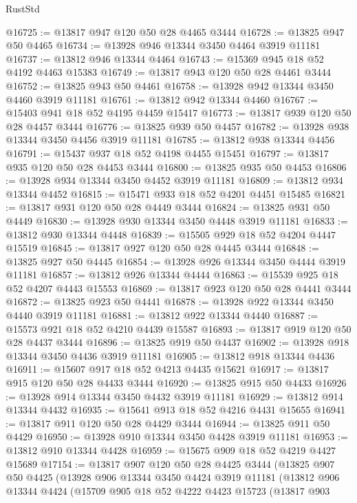 \begin{lexlean}{RustStd}
\begin{coremodule}
@16725 := @13817 @947 @120 @50 @28 @4465 @3444
@16728 := @13825 @947 @50 @4465
@16734 := @13928 @946 @13344 @3450 @4464 @3919 @11181
@16737 := @13812 @946 @13344 @4464
@16743 := @15369 @945 @18 @52 @4192 @4463 @15383
@16749 := @13817 @943 @120 @50 @28 @4461 @3444
@16752 := @13825 @943 @50 @4461
@16758 := @13928 @942 @13344 @3450 @4460 @3919 @11181
@16761 := @13812 @942 @13344 @4460
@16767 := @15403 @941 @18 @52 @4195 @4459 @15417
@16773 := @13817 @939 @120 @50 @28 @4457 @3444
@16776 := @13825 @939 @50 @4457
@16782 := @13928 @938 @13344 @3450 @4456 @3919 @11181
@16785 := @13812 @938 @13344 @4456
@16791 := @15437 @937 @18 @52 @4198 @4455 @15451
@16797 := @13817 @935 @120 @50 @28 @4453 @3444
@16800 := @13825 @935 @50 @4453
@16806 := @13928 @934 @13344 @3450 @4452 @3919 @11181
@16809 := @13812 @934 @13344 @4452
@16815 := @15471 @933 @18 @52 @4201 @4451 @15485
@16821 := @13817 @931 @120 @50 @28 @4449 @3444
@16824 := @13825 @931 @50 @4449
@16830 := @13928 @930 @13344 @3450 @4448 @3919 @11181
@16833 := @13812 @930 @13344 @4448
@16839 := @15505 @929 @18 @52 @4204 @4447 @15519
@16845 := @13817 @927 @120 @50 @28 @4445 @3444
@16848 := @13825 @927 @50 @4445
@16854 := @13928 @926 @13344 @3450 @4444 @3919 @11181
@16857 := @13812 @926 @13344 @4444
@16863 := @15539 @925 @18 @52 @4207 @4443 @15553
@16869 := @13817 @923 @120 @50 @28 @4441 @3444
@16872 := @13825 @923 @50 @4441
@16878 := @13928 @922 @13344 @3450 @4440 @3919 @11181
@16881 := @13812 @922 @13344 @4440
@16887 := @15573 @921 @18 @52 @4210 @4439 @15587
@16893 := @13817 @919 @120 @50 @28 @4437 @3444
@16896 := @13825 @919 @50 @4437
@16902 := @13928 @918 @13344 @3450 @4436 @3919 @11181
@16905 := @13812 @918 @13344 @4436
@16911 := @15607 @917 @18 @52 @4213 @4435 @15621
@16917 := @13817 @915 @120 @50 @28 @4433 @3444
@16920 := @13825 @915 @50 @4433
@16926 := @13928 @914 @13344 @3450 @4432 @3919 @11181
@16929 := @13812 @914 @13344 @4432
@16935 := @15641 @913 @18 @52 @4216 @4431 @15655
@16941 := @13817 @911 @120 @50 @28 @4429 @3444
@16944 := @13825 @911 @50 @4429
@16950 := @13928 @910 @13344 @3450 @4428 @3919 @11181
@16953 := @13812 @910 @13344 @4428
@16959 := @15675 @909 @18 @52 @4219 @4427 @15689
@17154 := @13817
    @907
    @120
    @50
    @28
    @4425
    @3444
    (@13825
      @907
      @50
      @4425
      (@13928
        @906
        @13344
        @3450
        @4424
        @3919
        @11181
        (@13812
          @906
          @13344
          @4424
          (@15709
            @905
            @18
            @52
            @4222
            @4423
            @15723
            (@13817
              @903

\end{coremodule}
\end{lexlean}
